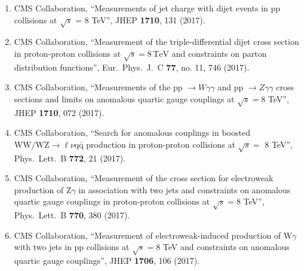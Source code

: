 \begin{itemize}
\begin{enumerate}
\item CMS Collaboration, ``Measurements of jet charge with dijet events in pp collisions at $\sqrt{s}$ = 8 TeV'', JHEP {\bf 1710}, 131 (2017).

\item CMS Collaboration, ``Measurement of the triple-differential dijet cross section in proton-proton collisions at $\sqrt{s}=8\,\text {TeV} $ and constraints on parton distribution functions'', Eur.\ Phys.\ J.\ C {\bf 77}, no. 11, 746 (2017).

\item CMS Collaboration, ``Measurements of the pp $\to W\gamma\gamma$ and pp $\to Z\gamma\gamma$ cross sections and limits on anomalous quartic gauge couplings at $ \sqrt{s}=8 $ TeV'', JHEP {\bf 1710}, 072 (2017).

\item CMS Collaboration, ``Search for anomalous couplings in boosted $\mathrm{ WW/WZ }\to\ell\nu\mathrm{ q \bar{q} }$ production in proton-proton collisions at $\sqrt{s} =$ 8 TeV'', Phys.\ Lett.\ B {\bf 772}, 21 (2017).

\item CMS Collaboration, ``Measurement of the cross section for electroweak production of Z$\gamma$ in association with two jets and constraints on anomalous quartic gauge couplings in proton-proton collisions at $\sqrt{s} = 8$ TeV'', Phys.\ Lett.\ B {\bf 770}, 380 (2017).

\item CMS Collaboration, ``Measurement of electroweak-induced production of W$\gamma$ with two jets in pp collisions at $ \sqrt{s}=8 $ TeV and constraints on anomalous quartic gauge couplings'', JHEP {\bf 1706}, 106 (2017).


\end{enumerate}
\end{itemize}
